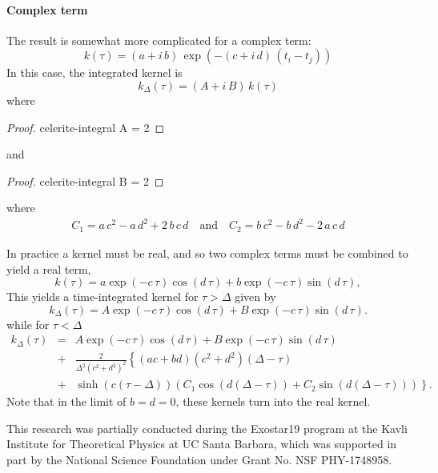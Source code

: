 \documentclass[modern]{aastex62}
\begin{document}
\paragraph{Complex term}

The result is somewhat more complicated for a complex term:
\begin{equation}
k(\tau) = (a + i\,b)\,\exp\left(-(c+i\,d)\,(t_i - t_j)\right)
\end{equation}
In this case, the integrated kernel is
\begin{equation}
k_\Delta(\tau) = (A + i\,B)\,k(\tau)
\end{equation}
where
\begin{proof}{celerite-integral}
  A = 2
\end{proof}
and
\begin{proof}{celerite-integral}
  B = 2
\end{proof}
where
\begin{align}
C_1 = a\,c^2 - a\,d^2 + 2\,b\,c\,d
\quad\mathrm{and}\quad
C_2 = b\,c^2 - b\,d^2 - 2\,a\,c\,d
\end{align}

In practice a kernel must be real, and so two complex terms must be
combined to yield a real term,
\begin{equation}
k(\tau) = a \exp\left(-c\,\tau\right)\cos\left(d\,\tau\right) + b \exp\left(-c\,\tau\right)\sin\left(d\,\tau\right),
\end{equation}
This yields a time-integrated kernel for $\tau > \Delta$ given by
\begin{equation}
k_\Delta(\tau) = A\exp\left(-c\,\tau\right)\cos\left(d\,\tau\right) + B\exp\left(-c\,\tau\right)\sin\left(d\,\tau\right).
\end{equation}
while for $\tau < \Delta$
\begin{align}
k_\Delta(\tau) &=& A\exp\left(-c\,\tau\right)\cos\left(d\,\tau\right) + B\exp\left(-c\,\tau\right)\sin\left(d\,\tau\right) \nonumber\\
&+&  \frac{2}{ \Delta^2(c^2+d^2)^2} \left\{(ac+bd)(c^2+d^2)(\Delta-\tau)\right. \nonumber \\
&+&\left.  \sinh(c(\tau-\Delta)) \left(C_1\cos(d(\Delta-\tau)) +C_2 \sin(d(\Delta-\tau))\right) \right\}.
\end{align}
Note that in the limit of $b = d = 0$, these kernels turn into the real kernel.

\newpage
\acknowledgements

This research was partially conducted during the Exostar19 program at the Kavli Institute for Theoretical Physics at UC Santa Barbara, which was supported in part by the National Science Foundation under Grant No. NSF PHY-1748958.

\newpage

\end{document}
